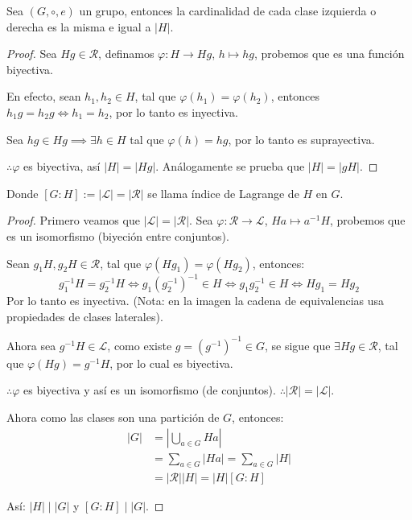 \begin{prop}
	Sea $(G, \circ, e)$ un grupo, entonces la cardinalidad de cada clase izquierda o derecha es la misma e igual a $|H|$.
\end{prop}

\begin{proof}
	Sea $Hg \in \mathcal{R}$, definamos $\varphi: H \to Hg$, $h \mapsto hg$, probemos que es una función biyectiva.

	En efecto, sean $h_1, h_2 \in H$, tal que $\varphi(h_1) = \varphi(h_2)$, entonces $h_1 g = h_2 g \iff h_1 = h_2$, por lo tanto es inyectiva.

	Sea $hg \in Hg \implies \exists h \in H$ tal que $\varphi(h) = hg$, por lo tanto es suprayectiva.

	$\therefore \varphi$ es biyectiva, así $|H| = |Hg|$. Análogamente se prueba que $|H| = |gH|$.
\end{proof}


Donde $[G:H] := |\mathcal{L}| = |\mathcal{R}|$ se llama índice de Lagrange de $H$ en $G$.

\begin{proof}
	Primero veamos que $|\mathcal{L}| = |\mathcal{R}|$. Sea $\varphi: \mathcal{R} \to \mathcal{L}$, $Ha \mapsto a^{-1}H$, probemos que es un isomorfismo (biyeción entre conjuntos).

	Sean $g_1 H, g_2 H \in \mathcal{R}$, tal que $\varphi(Hg_1) = \varphi(Hg_2)$, entonces:
	\begin{equation*}
		g_1^{-1} H = g_2^{-1} H \iff g_1 (g_2^{-1})^{-1} \in H \iff g_1 g_2^{-1} \in H \iff Hg_1 = Hg_2
	\end{equation*}
	Por lo tanto es inyectiva. (Nota: en la imagen la cadena de equivalencias usa propiedades de clases laterales).

	Ahora sea $g^{-1}H \in \mathcal{L}$, como existe $g=(g^{-1})^{-1} \in G$, se sigue que $\exists Hg \in \mathcal{R}$, tal que $\varphi(Hg) = g^{-1}H$, por lo cual es biyectiva.

	$\therefore \varphi$ es biyectiva y así es un isomorfismo (de conjuntos).
	$\therefore |\mathcal{R}| = |\mathcal{L}|$.

	Ahora como las clases son una partición de $G$, entonces:
	\begin{align*}
		|G| & = \left| \bigcup_{a \in G} Ha \right|      \\
		    & = \sum_{a \in G} |Ha| = \sum_{a \in G} |H| \\
		    & = |\mathcal{R}| |H| = |H| [G:H]
	\end{align*}

	Así: $|H| \mid |G|$ y $[G:H] \mid |G|$.
\end{proof}

